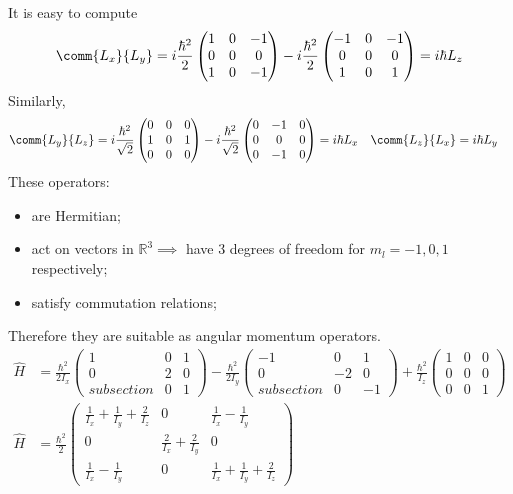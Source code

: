 \documentclass[12pt]{article}
\begin{document}
\subsection{} It is easy to compute \begin{align*}
\comm{L_x}{L_y} = i\frac{\hbar^2}{2} \begin{pmatrix} 1&0&-1\\
0&0&0\\
1&0&-1\end{pmatrix} - i\frac{\hbar^2}{2}\begin{pmatrix} -1&0&-1\\
0&0&0\\
1&0&1 \end{pmatrix} = i\hbar L_z
\end{align*}
Similarly, 
\begin{align*}
\comm{L_y}{L_z} &= i\frac{\hbar^2}{\sqrt{2}} \begin{pmatrix} 0&0&0\\
1&0&1\\
0&0&0\end{pmatrix} - i\frac{\hbar^2}{\sqrt{2}}\begin{pmatrix} 0&-1&0\\
0&0&0\\
0&- 1&0 \end{pmatrix} = i\hbar L_x &\comm{L_z}{L_x}&= i\hbar L_y
\end{align*}
These operators:\begin{itemize}
\item are Hermitian;
\item act on vectors in \(\mathbb{R}^3 \implies \) have 3 degrees of freedom for \(m_l =- 1,0,1\) respectively;
\item satisfy commutation relations;
\end{itemize}
Therefore they are suitable as angular momentum operators.
\begin{align*}
\hat{H} &=  \frac{\hbar^2}{2I_x}\begin{pmatrix} 1&0&1\\0&2&0\\subsection{}&0&1 \end{pmatrix} - \frac{\hbar^2}{2I_y} \begin{pmatrix} - 1&0&1\\0&- 2&0\\subsection{}&0&- 1 \end{pmatrix} + \frac{\hbar^2}{I_z}\begin{pmatrix}1&0&0\\0&0&0\\0&0&1  \end{pmatrix}\\
\hat{H} &=  \frac{\hbar^2}{2}
\begin{pmatrix} 
    \frac{1}{I_x} + \frac{1}{I_y} + \frac{2}{I_z}&0&\frac{1}{I_x} - \frac{1}{I_y}\\
    0&\frac{2}{I_x} + \frac{2}{I_y}&0\\
    \frac{1}{I_x} - \frac{1}{I_y}&0&\frac{1}{I_x} + \frac{1}{I_y} + \frac{2}{I_z}
\end{pmatrix} 
\end{align*}
\end{document}
